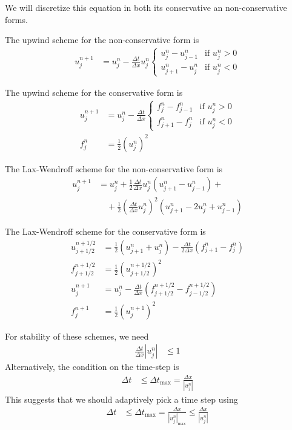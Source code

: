 \documentclass[twocolumn]{myarticle}
\begin{document}
We will discretize this equation in both its conservative an non-conservative forms.

The upwind scheme for the non-conservative form is
\begin{align}
u^{n+1}_j &= u^n_j - \frac{\Delta t}{\Delta x} u^n_j \begin{cases} u^n_j - u^n_{j-1} & \text{if } u^n_j > 0 \\ u^n_{j+1} - u^n_j & \text{if } u^n_j < 0 \end{cases}
\end{align}

The upwind scheme for the conservative form is
\begin{align}
    u^{n+1}_j &= u^n_j - \frac{\Delta t}{\Delta x} \begin{cases} f^n_j - f^n_{j-1} & \text{if } u^n_j > 0 \\ f^n_{j+1} - f^n_j & \text{if } u^n_j < 0 \end{cases}
    \\
    f^n_j &= \frac{1}{2} \left( u^n_j \right)^2
\end{align}

The Lax-Wendroff scheme for the non-conservative form is
\begin{align}
    u^{n+1}_j &= u^n_j + \frac{1}{2} \frac{\Delta t}{\Delta x} u^n_j \left(u^{n}_{j+1} - u^{n}_{j-1}\right) + \nonumber
    \\
    & \quad + \frac{1}{2} \left( \frac{\Delta t}{\Delta x} u^n_j \right)^2 \left(u^{n}_{j+1} - 2 u^n_j + u^{n}_{j-1}\right) 
\end{align}

The Lax-Wendroff scheme for the conservative form is
\begin{align}
    u^{n+1/2}_{j+1/2} &= \frac{1}{2} \left( u^n_{j+1} + u^n_{j} \right) - \frac{\Delta t}{2 \Delta x} \left( f^n_{j+1} - f^n_{j} \right)
    \\
    f^{n+1/2}_{j+1/2} &= \frac{1}{2} \left( u^{n+1/2}_{j+1/2} \right)^2
    \\
    u^{n+1}_j &= u^n_j - \frac{\Delta t}{\Delta x} \left( f^{n+1/2}_{j+1/2} - f^{n+1/2}_{j-1/2} \right)
    \\
    f^{n+1}_j &= \frac{1}{2} \left( u^{n+1}_j \right)^2
\end{align}

For stability of these schemes, we need
\begin{align}
    \frac{\Delta t}{\Delta x} \left| u^n_j \right| &\leq 1
\end{align}
Alternatively, the condition on the time-step is
\begin{align}
    \Delta t &\leq \Delta t_\text{max} = \frac{\Delta x}{\left| u^n_j \right|}
\end{align}
This suggests that we should adaptively pick a time step using
\begin{align}
    \Delta t &\leq \Delta t_\text{max} = \frac{\Delta x}{\left| u^n_j \right|_\text{max}} \leq \frac{\Delta x}{\left| u^n_j \right|}
\end{align}
\end{document}
